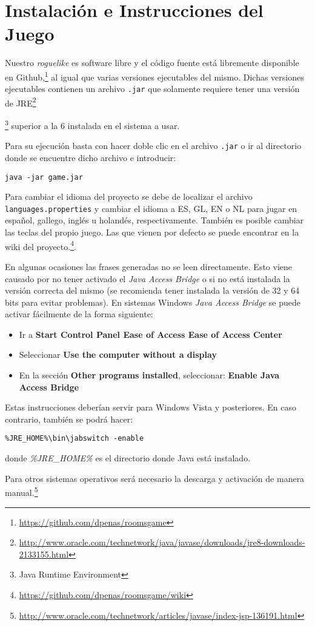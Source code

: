 \chapter{Instalación e Instrucciones del Juego}
\label{ref:instalacion}

Nuestro \textit{roguelike} es software libre y el código fuente está libremente disponible en Github,\footnote{\url{https://github.com/dpenas/roomsgame}} al igual que varias versiones ejecutables del mismo. Dichas versiones ejecutables contienen un archivo \texttt{.jar} que solamente requiere tener una versión de JRE\footnote{\url{http://www.oracle.com/technetwork/java/javase/downloads/jre8-downloads-2133155.html}}{\footnote{Java Runtime Environment} superior a la 6 instalada en el sistema a usar. 

Para su ejecución basta con hacer doble clic en el archivo \texttt{.jar} o ir al directorio donde se encuentre dicho archivo e introducir:

\begin{lstlisting}[label=lst:bash,caption=Comando para la ejecución del videojuego]
java -jar game.jar
\end{lstlisting}

Para cambiar el idioma del proyecto se debe de localizar el archivo \texttt{languages.properties} y cambiar el idioma a ES, GL, EN o NL para jugar en español, gallego, inglés u holandés, respectivamente. También es posible cambiar las teclas del propio juego. Las que vienen por defecto se puede encontrar en la wiki del proyecto.\footnote{\url{https://github.com/dpenas/roomsgame/wiki}}.

En algunas ocasiones las frases generadas no se leen directamente. Esto viene causado por no tener activado el \textit{Java Access Bridge} o si no está instalada la versión correcta del mismo (se recomienda tener instalada la versión de 32 y 64 bits para evitar problemas). 
En sistemas Windows \textit{Java Access Bridge} se puede activar fácilmente de la forma siguiente:

\begin{itemize}
\item Ir a \textbf{Start \textrightarrow Control Panel \textrightarrow Ease of Access \textrightarrow Ease of Access Center}
\item Seleccionar \textbf{Use the computer without a display}
\item En la sección \textbf{Other programs installed}, seleccionar: \textbf{Enable Java Access Bridge}
\end{itemize}

\noindent Estas instrucciones deberían servir para Windows Vista y posteriores. En caso contrario, también se podrá hacer:

\begin{verbatim}
%JRE_HOME%\bin\jabswitch -enable
\end{verbatim}

donde \textit{\%JRE\_HOME\%} es el directorio donde Java está instalado.

\noindent Para otros sistemas operativos será necesario la descarga y activación de manera manual.\footnote{\url{http://www.oracle.com/technetwork/articles/javase/index-jsp-136191.html}}}